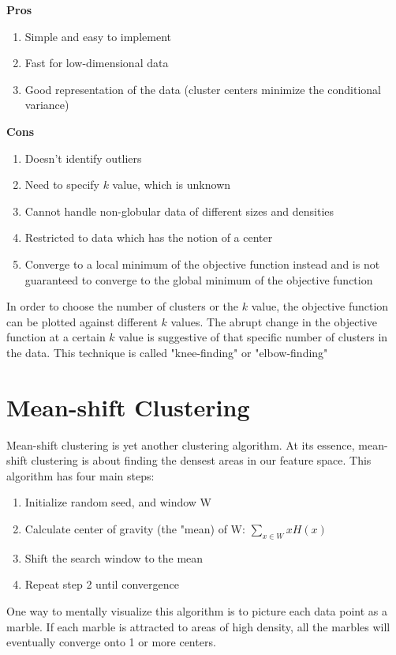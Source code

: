 \documentclass{article}
\begin{document}
\textbf{Pros}
\begin{enumerate}
\item Simple and easy to implement
\item Fast for low-dimensional data
\item Good representation of the data (cluster centers minimize the conditional variance)
\end{enumerate}
\textbf{Cons}
\begin{enumerate}
\item Doesn't identify outliers
\item Need to specify $k$ value, which is unknown 
\item Cannot handle non-globular data of different sizes and densities
\item Restricted to data which has the notion of a center 
\item Converge to a local minimum of the objective function instead and is not guaranteed to converge to the global minimum of the objective function
\end{enumerate}
In order to choose the number of clusters or the $k$ value, the objective function can be plotted against different $k$ values. The abrupt change in the objective function at a certain $k$ value is suggestive of that specific number of clusters in the data. This technique is called "knee-finding" or "elbow-finding"

\section{Mean-shift Clustering}
Mean-shift clustering is yet another clustering algorithm. At its essence, mean-shift clustering is about finding the densest areas in our feature space. This algorithm has four main steps:
\begin{enumerate}
    \item Initialize random seed, and window W
    \item Calculate center of gravity (the "mean) of W: $\displaystyle \sum_{x \in W} xH(x)$
    \item Shift the search window to the mean
    \item Repeat step 2 until convergence
\end{enumerate}
One way to mentally visualize this algorithm is to picture each data point as a marble. If each marble is attracted to areas of high density, all the marbles will eventually converge onto 1 or more centers.
\end{document}
